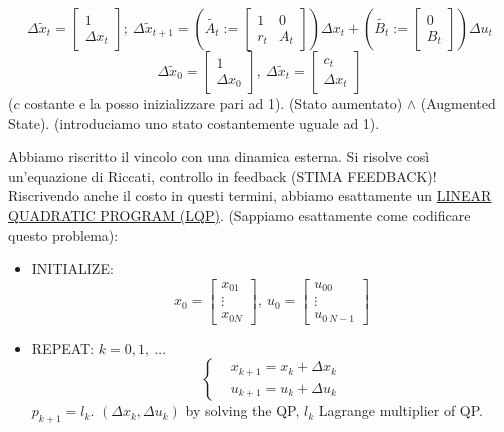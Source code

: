\[
	\Delta\tilde{x}_t = \begin{bmatrix}1\\ \Delta x_t\end{bmatrix};\ \Delta\tilde{x}_{t+1} = (\tilde{A_t} := \begin{bmatrix}1&0\\r_t&A_t\end{bmatrix})\Delta x_t + (\tilde{B_t} := \begin{bmatrix}0\\B_t\end{bmatrix})\Delta u_t
\]
\[
	\Delta\tilde{x}_0 = \begin{bmatrix}1\\ \Delta x_0\end{bmatrix},\ \Delta\tilde{x}_t = \begin{bmatrix}c_t\\ \Delta x_t\end{bmatrix}
\]
($c$ costante e la posso inizializzare pari ad 1). (Stato aumentato) $\land$ (Augmented State). (introduciamo uno stato costantemente uguale ad 1).

Abbiamo riscritto il vincolo con una dinamica esterna. Si risolve così un'equazione di Riccati, controllo in feedback (STIMA FEEDBACK)! Riscrivendo anche il costo in questi termini, abbiamo esattamente un \underline{LINEAR QUADRATIC PROGRAM (LQP)}. (Sappiamo esattamente come codificare questo problema):

\begin{itemize}
\item{INITIALIZE}:
\[
	x_0 = \begin{bmatrix}x_{01}\\ \vdots\\x_{0N}\end{bmatrix},\ u_0 = \begin{bmatrix}u_{00}\\ \vdots\\u_{0\ N-1}\end{bmatrix}
\]
\item{REPEAT}: $k=0,1,\ \dots$
\[
	\left\{
	\begin{aligned}
	&x_{k+1} = x_k + \Delta x_k\\
	&u_{k+1} = u_k + \Delta u_k
	\end{aligned}
	\right.
\]
$p_{k+1}=l_k$. $(\Delta x_k,\Delta u_k)$ by solving the QP, $l_k$ Lagrange multiplier of QP.
\end{itemize}

